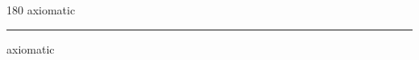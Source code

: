 
\begin{frame}
\begin{center}
\begin{turn}{180}
{\fontsize{2.5cm}{1em}\selectfont axiomatic}
\end{turn}
\vspace{1em}\par  
\hrule
\vspace{1em}\par  
{\fontsize{2.5cm}{1em}\selectfont axiomatic}
\end{center}
\end{frame}
